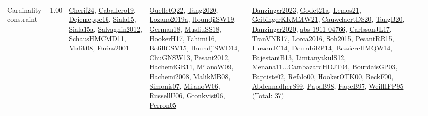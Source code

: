 {\begin{longtable}{p{3cm}r>{\raggedright\arraybackslash}p{6cm}>{\raggedright\arraybackslash}p{6cm}>{\raggedright\arraybackslash}p{8cm}}
\index{Cardinality constraint}\index{Constraints!Cardinality constraint}Cardinality constraint &  1.00 & \hyperref[detail:Cherif24]{Cherif24}, \hyperref[detail:Caballero19]{Caballero19}, \hyperref[detail:Dejemeppe16]{Dejemeppe16}, \hyperref[detail:Siala15]{Siala15}, \hyperref[detail:Siala15a]{Siala15a}, \hyperref[detail:Salvagnin2012]{Salvagnin2012}, \hyperref[detail:SchausHMCMD11]{SchausHMCMD11}, \hyperref[detail:Malik08]{Malik08}, \hyperref[detail:Farias2001]{Farias2001} & \hyperref[detail:OuelletQ22]{OuelletQ22}, \hyperref[detail:Tang2020]{Tang2020}, \hyperref[detail:Lozano2019a]{Lozano2019a}, \hyperref[detail:HoundjiSW19]{HoundjiSW19}, \hyperref[detail:German18]{German18}, \hyperref[detail:MusliuSS18]{MusliuSS18}, \hyperref[detail:HookerH17]{HookerH17}, \hyperref[detail:Fahimi16]{Fahimi16}, \hyperref[detail:BofillGSV15]{BofillGSV15}, \hyperref[detail:HoundjiSWD14]{HoundjiSWD14}, \hyperref[detail:ChuGNSW13]{ChuGNSW13}, \hyperref[detail:Pesant2012]{Pesant2012}, \hyperref[detail:HachemiGR11]{HachemiGR11}, \hyperref[detail:MilanoW09]{MilanoW09}, \hyperref[detail:Hachemi2008]{Hachemi2008}, \hyperref[detail:MalikMB08]{MalikMB08}, \hyperref[detail:Simonis07]{Simonis07}, \hyperref[detail:MilanoW06]{MilanoW06}, \hyperref[detail:RussellU06]{RussellU06}, \hyperref[detail:Gronkvist06]{Gronkvist06}, \hyperref[detail:Perron05]{Perron05} & \hyperref[detail:Danzinger2023]{Danzinger2023}, \hyperref[detail:Godet21a]{Godet21a}, \hyperref[detail:Lemos21]{Lemos21}, \hyperref[detail:GeibingerKKMMW21]{GeibingerKKMMW21}, \hyperref[detail:CauwelaertDS20]{CauwelaertDS20}, \hyperref[detail:TangB20]{TangB20}, \hyperref[detail:Danzinger2020]{Danzinger2020}, \hyperref[detail:abs-1911-04766]{abs-1911-04766}, \hyperref[detail:CarlssonJL17]{CarlssonJL17}, \hyperref[detail:TranVNB17]{TranVNB17}, \hyperref[detail:Lorca2016]{Lorca2016}, \hyperref[detail:Soh2015]{Soh2015}, \hyperref[detail:PesantRR15]{PesantRR15}, \hyperref[detail:LarsonJC14]{LarsonJC14}, \hyperref[detail:DoulabiRP14]{DoulabiRP14}, \hyperref[detail:BessiereHMQW14]{BessiereHMQW14}, \hyperref[detail:BajestaniB13]{BajestaniB13}, \hyperref[detail:LimtanyakulS12]{LimtanyakulS12}, \hyperref[detail:Menana11]{Menana11}...\hyperref[detail:CambazardHDJT04]{CambazardHDJT04}, \hyperref[detail:BourdaisGP03]{BourdaisGP03}, \hyperref[detail:Baptiste02]{Baptiste02}, \hyperref[detail:Refalo00]{Refalo00}, \hyperref[detail:HookerOTK00]{HookerOTK00}, \hyperref[detail:BeckF00]{BeckF00}, \hyperref[detail:AbdennadherS99]{AbdennadherS99}, \hyperref[detail:PapaB98]{PapaB98}, \hyperref[detail:PapeB97]{PapeB97}, \hyperref[detail:WeilHFP95]{WeilHFP95} (Total: 37)\\

\end{longtable}}
